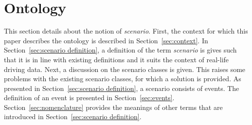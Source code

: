 \section{Ontology}
\label{sec:ontology}

This section details about the notion of \emph{scenario}. First, the context for which this paper describes the ontology is described in Section~\ref{sec:context}. In Section~\ref{sec:scenario definition}, a definition of the term \emph{scenario} is gives such that it is in line with existing definitions and it suits the context of real-life driving data. Next, a discussion on the scenario classes is given. This raises some problems with the existing scenario classes, for which a solution is provided. As presented in Section~\ref{sec:scenario definition}, a scenario consists of events. The definition of an event is presented in Section~\ref{sec:events}. Section~\ref{sec:nomenclature} provides the meanings of other terms that are introduced in Section~\ref{sec:scenario definition}.






